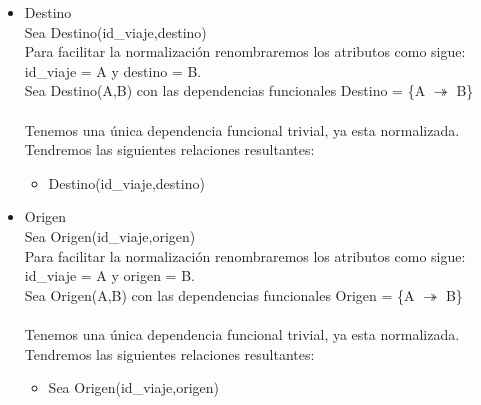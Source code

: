 \documentclass{article}
\begin{document}
\begin{itemize}
\item Destino\\
Sea Destino(id\_viaje,destino)\\
Para facilitar la normalización renombraremos los atributos como sigue:
id\_viaje = A y destino = B.\\
Sea Destino(A,B) con las dependencias funcionales
Destino = \{A $\twoheadrightarrow$ B\} \\
\\
Tenemos una única dependencia funcional trivial, ya esta normalizada.
Tendremos las siguientes relaciones resultantes:
\begin{itemize}
\item Destino(id\_viaje,destino)\\
\end{itemize}

\item Origen\\
Sea Origen(id\_viaje,origen)\\
Para facilitar la normalización renombraremos los atributos como sigue:
id\_viaje = A y origen = B.\\
Sea Origen(A,B) con las dependencias funcionales
Origen = \{A $\twoheadrightarrow$ B\} \\
\\
Tenemos una única dependencia funcional trivial, ya esta normalizada.
Tendremos las siguientes relaciones resultantes:
\begin{itemize}
\item Sea Origen(id\_viaje,origen)\\
\end{itemize}


\end{itemize}
\end{document}
